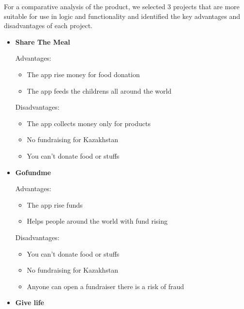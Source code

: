 \begin{enumerate}
        For a comparative analysis of the product, we selected 3 projects that are more suitable for use in logic and functionality and identified the key advantages and disadvantages of each project.
        
        
        
        \begin{itemize}
            \item \textbf{Share The Meal} 
            
                Advantages:
                \begin{itemize}
                    \item The app rise money for food donation
                    \item The app feeds the childrens all around the world
                \end{itemize}
                Disadvantages:
                \begin{itemize}
                    \item The app collects money only for products
                    \item No fundraising for Kazakhstan
                    \item You can’t donate food or stuffs
                \end{itemize}
                
            \item \textbf{Gofundme}
                
                Advantages:
                \begin{itemize}
                    \item The app rise funds
                    \item Helps people around the world with fund rising
                \end{itemize}
                Disadvantages:
                \begin{itemize}
                    \item You can’t donate food or stuffs
                    \item No fundraising for Kazakhstan
                    \item Anyone can open a fundraiser there is a risk of fraud
                \end{itemize}
                
            \item \textbf{Give life}
                

\end{itemize}
\end{enumerate}
